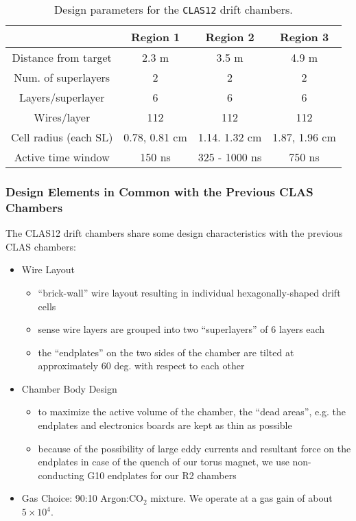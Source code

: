 \small{
\begin{table}[ht]
\begin{center}
\begin{tabular}{||c|c|c|c||} \hline \hline
            &{\bf Region 1}&{\bf Region 2}&{\bf Region 3}\\ \hline
Distance from target & 2.3 m    & 3.5 m        & 4.9 m    \\ \hline
Num. of superlayers  & 2        & 2            & 2        \\ \hline
Layers/superlayer    & 6        & 6            & 6        \\ \hline
Wires/layer          & 112      & 112          & 112      \\ \hline
Cell radius (each SL) & 0.78, 0.81 cm  & 1.14. 1.32 cm      & 1.87, 1.96 cm  \\ \hline
Active time window   & 150 ns   & 325 - 1000 ns & 750 ns   \\ \hline
\end{tabular}
\caption{\small{Design parameters for the {\tt CLAS12} drift chambers.}}
\label{fwd-dc-design-parms}
\end{center}
\end{table}
}

\subsubsection{Design Elements in Common with the Previous CLAS Chambers}
The CLAS12 drift chambers share some design characteristics with the
previous CLAS chambers:
\begin{itemize}
\item Wire Layout
\begin{itemize}
\item ``brick-wall'' wire layout resulting in individual hexagonally-shaped
drift cells
\item sense wire layers are grouped into two ``superlayers'' of 6 layers each
\item the ``endplates'' on the two sides of the chamber are tilted 
at approximately 60 deg. with respect to each other
\end{itemize}
\item Chamber Body Design
\begin{itemize}
\item to maximize the active volume of the chamber, the ``dead areas'', e.g.
the endplates and electronics boards are kept as thin as possible
\item because of the possibility of large eddy currents and resultant
force on the endplates in case of the quench of our torus magnet, we
use non-conducting G10 endplates for our R2 chambers
\end{itemize}
\item Gas Choice: 90:10 Argon:CO$_2$ mixture.  We operate at a gas gain of 
about $5 \times 10^4$.
\end{itemize}


